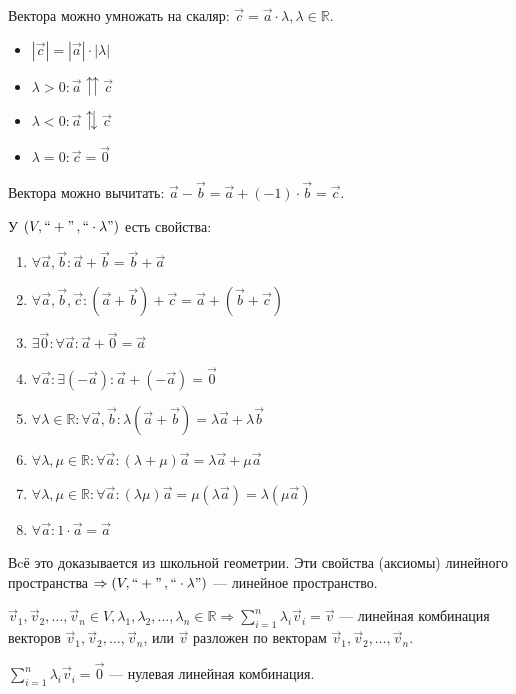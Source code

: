 Вектора можно умножать на скаляр: \(\vec c = \vec a \cdot \lambda, \lambda \in \mathbb R\).
\begin{itemize}
    \item[] \(|\vec c| = |\vec a| \cdot |\lambda|\)
    \item[] \(\lambda > 0: \vec a \upuparrows \vec c\)
    \item[] \(\lambda < 0: \vec a \updownarrows \vec c\)
    \item[] \(\lambda = 0: \vec c = \vec 0\)
\end{itemize}
Вектора можно вычитать: \(\vec a - \vec b = \vec a + (-1) \cdot \vec b = \vec c\).

У \((V, ``+" \,, ``\cdot \lambda")\) есть свойства:
\begin{enumerate}
    \item \(\forall \vec a, \vec b: \vec a + \vec b = \vec b + \vec a\)
    \item \(\forall \vec a, \vec b, \vec c: (\vec a + \vec b) + \vec c = \vec a + (\vec b + \vec c)\)
    \item \(\exists \vec 0: \forall \vec a: \vec a + \vec0 = \vec a\)
    \item \(\forall \vec a: \exists (- \vec a): \vec a+(- \vec a) = \vec 0\)
    \item \(\forall \lambda \in \mathbb R: \forall \vec a, \vec b: \lambda (\vec a + \vec b) = \lambda \vec a + \lambda \vec b\)
    \item \(\forall \lambda, \mu \in \mathbb R: \forall \vec a: (\lambda + \mu)\vec a = \lambda \vec a + \mu \vec a\)
    \item \(\forall \lambda, \mu \in \mathbb R: \forall \vec a: (\lambda \mu)\vec a = \mu(\lambda \vec a) = \lambda (\mu \vec a )\)
    \item \(\forall \vec a: 1 \cdot \vec a = \vec a\)
\end{enumerate}

Вcё это доказывается из школьной геометрии. Эти свойства (аксиомы) линейного пространства \(\Rightarrow (V, ``+" \,, ``\cdot \lambda")\) --- линейное пространство.

\(
\vec v_1, \vec v_2, \dots, \vec v_n \in V , 
    \lambda_1, \lambda_2, \dots, \lambda_n \in \mathbb{R}
\Rightarrow \sum\limits_{i = 1}^{n} \lambda_i \vec v_i = \vec v\) --- линейная комбинация векторов \(\vec v_1, \vec v_2, \dots, \vec v_n\), или \(\vec v\) разложен по векторам \(\vec v_1, \vec v_2, \dots, \vec v_n\).

\(\sum\limits_{i = 1}^{n} \lambda_i \vec v_i = \vec 0\) --- нулевая линейная комбинация.

